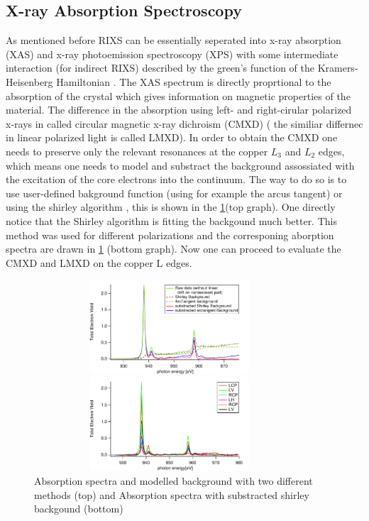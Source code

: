 \documentclass[twocolumn,amsmath,superscriptaddress,amssymb]{revtex4-1}
\begin{document}
\subsection{X-ray Absorption Spectroscopy}
As mentioned before RIXS can be essentially seperated into x-ray absorption (XAS) and x-ray photoemission spectroscopy (XPS) with some intermediate interaction (for indirect RIXS) described by the green's function of the Kramers-Heisenberg Hamiltonian \cite{GuarisePhD}. The XAS spectrum is directly proprtional to the absorption of the crystal which gives information on magnetic properties of the material. The difference in the absorption using left- and right-cirular polarized x-rays in called circular magnetic x-ray dichroism (CMXD) ( the similiar differnec in linear polarized light is called LMXD). In order to obtain the CMXD one needs to preserve only the relevant resonances at the copper $L_3$ and $L_2$ edges, which means one needs to model and substract the background assossiated with the excitation of the core electrons into the continuum. The way to do so is to use user-defined bakground function (using for example the arcus tangent) or using the shirley algorithm \cite{Gomez,Shirley}, this is shown in the \ref{TEY}(top graph).
One directly notice that the Shirley algorithm is fitting the backgound much better. This method was used for different polarizations and the corresponing aborption spectra are drawn in \ref{TEY} (bottom graph). Now one can proceed to evaluate the CMXD and LMXD on the copper L edges.\\
%
\begin{figure}
    \begin{minipage}[t]{\columnwidth}
        \includegraphics[width=0.9\textwidth, height=3.5cm ]{ShirleyBack.pdf}
    \end{minipage}
    \hfill
	\begin{minipage}[t]{\columnwidth}
        \includegraphics[width=0.9\textwidth, height=3.5cm]{TEY.pdf}
    \end{minipage}
\caption{Absorption spectra and modelled background with two different methods (top) and Absorption spectra with substracted shirley backgound (bottom)}
\label{TEY}
\end{figure}
\end{document}

